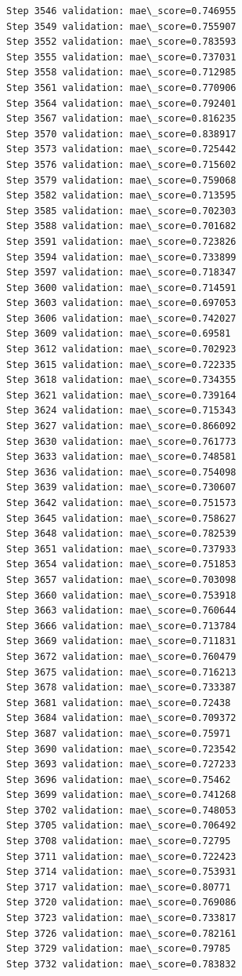 \documentclass[11pt]{article}
\begin{document}
\begin{Verbatim}[commandchars=\\\{\}]
Step 3546 validation: mae\_score=0.746955
Step 3549 validation: mae\_score=0.755907
Step 3552 validation: mae\_score=0.783593
Step 3555 validation: mae\_score=0.737031
Step 3558 validation: mae\_score=0.712985
Step 3561 validation: mae\_score=0.770906
Step 3564 validation: mae\_score=0.792401
Step 3567 validation: mae\_score=0.816235
Step 3570 validation: mae\_score=0.838917
Step 3573 validation: mae\_score=0.725442
Step 3576 validation: mae\_score=0.715602
Step 3579 validation: mae\_score=0.759068
Step 3582 validation: mae\_score=0.713595
Step 3585 validation: mae\_score=0.702303
Step 3588 validation: mae\_score=0.701682
Step 3591 validation: mae\_score=0.723826
Step 3594 validation: mae\_score=0.733899
Step 3597 validation: mae\_score=0.718347
Step 3600 validation: mae\_score=0.714591
Step 3603 validation: mae\_score=0.697053
Step 3606 validation: mae\_score=0.742027
Step 3609 validation: mae\_score=0.69581
Step 3612 validation: mae\_score=0.702923
Step 3615 validation: mae\_score=0.722335
Step 3618 validation: mae\_score=0.734355
Step 3621 validation: mae\_score=0.739164
Step 3624 validation: mae\_score=0.715343
Step 3627 validation: mae\_score=0.866092
Step 3630 validation: mae\_score=0.761773
Step 3633 validation: mae\_score=0.748581
Step 3636 validation: mae\_score=0.754098
Step 3639 validation: mae\_score=0.730607
Step 3642 validation: mae\_score=0.751573
Step 3645 validation: mae\_score=0.758627
Step 3648 validation: mae\_score=0.782539
Step 3651 validation: mae\_score=0.737933
Step 3654 validation: mae\_score=0.751853
Step 3657 validation: mae\_score=0.703098
Step 3660 validation: mae\_score=0.753918
Step 3663 validation: mae\_score=0.760644
Step 3666 validation: mae\_score=0.713784
Step 3669 validation: mae\_score=0.711831
Step 3672 validation: mae\_score=0.760479
Step 3675 validation: mae\_score=0.716213
Step 3678 validation: mae\_score=0.733387
Step 3681 validation: mae\_score=0.72438
Step 3684 validation: mae\_score=0.709372
Step 3687 validation: mae\_score=0.75971
Step 3690 validation: mae\_score=0.723542
Step 3693 validation: mae\_score=0.727233
Step 3696 validation: mae\_score=0.75462
Step 3699 validation: mae\_score=0.741268
Step 3702 validation: mae\_score=0.748053
Step 3705 validation: mae\_score=0.706492
Step 3708 validation: mae\_score=0.72795
Step 3711 validation: mae\_score=0.722423
Step 3714 validation: mae\_score=0.753931
Step 3717 validation: mae\_score=0.80771
Step 3720 validation: mae\_score=0.769086
Step 3723 validation: mae\_score=0.733817
Step 3726 validation: mae\_score=0.782161
Step 3729 validation: mae\_score=0.79785
Step 3732 validation: mae\_score=0.783832

\end{Verbatim}
\end{document}
